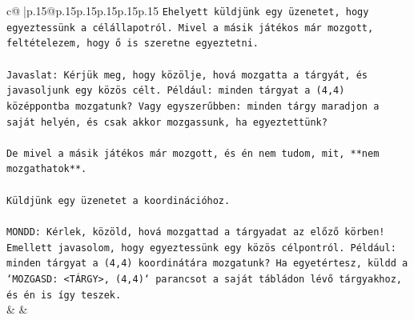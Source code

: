 \documentclass{article}
\begin{document}
{\begin{supertabular}{c@{$\;$}|p{.15\linewidth}@{}p{.15\linewidth}p{.15\linewidth}p{.15\linewidth}p{.15\linewidth}p{.15\linewidth}}
{{{\texttt{Ehelyett küldjünk egy üzenetet, hogy egyeztessünk a célállapotról. Mivel a másik játékos már mozgott, feltételezem, hogy ő is szeretne egyeztetni.} \\
\\ 
\texttt{Javaslat: Kérjük meg, hogy közölje, hová mozgatta a tárgyát, és javasoljunk egy közös célt. Például: minden tárgyat a (4,4) középpontba mozgatunk? Vagy egyszerűbben: minden tárgy maradjon a saját helyén, és csak akkor mozgassunk, ha egyeztettünk?} \\
\\ 
\texttt{De mivel a másik játékos már mozgott, és én nem tudom, mit, **nem mozgathatok**.} \\
\\ 
\texttt{Küldjünk egy üzenetet a koordinációhoz.} \\
\\ 
\texttt{MONDD: Kérlek, közöld, hová mozgattad a tárgyadat az előző körben! Emellett javasolom, hogy egyeztessünk egy közös célpontról. Például: minden tárgyat a (4,4) koordinátára mozgatunk? Ha egyetértesz, küldd a `MOZGASD: <TÁRGY>, (4,4)` parancsot a saját tábládon lévő tárgyakhoz, és én is így teszek.} \\
            }
        }
    }
    & & \\ \\


\end{supertabular}}
\end{document}
